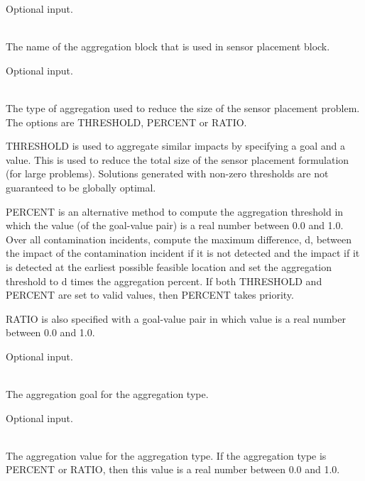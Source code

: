 \begin{description}[topsep=0pt,parsep=0.5em,itemsep=-0.4em]
\begin{description}[topsep=0pt,parsep=0.5em,itemsep=-0.4em]
                Optional input.
  \end{description}
  \item[{aggregate}]\hfill
  \begin{description}[topsep=0pt,parsep=0.5em,itemsep=-0.4em]
    \item[{name}]\hfill
\\The name of the aggregation block that is used in sensor placement block.
                
                Optional input.
    \item[{type}]\hfill
\\The type of aggregation used to reduce the size of the sensor placement problem.  
                The options are THRESHOLD, PERCENT or RATIO.

                THRESHOLD is used to aggregate similar impacts by specifying a goal and a value.  
                This is used to reduce the total size of the sensor placement formulation (for large problems).
                Solutions generated with non-zero thresholds are not guaranteed
                to be globally optimal.

                PERCENT is an alternative method to compute the aggregation threshold 
                in which the value (of the goal-value pair) is a real number between 0.0 and 1.0. 
                Over all contamination incidents, compute the maximum difference, d, between the impact of the
                contamination incident if it is not detected and the impact if it is detected
                at the earliest possible feasible location and set the aggregation threshold to 
                d times the aggregation percent. If both THRESHOLD and PERCENT are set to valid values, 
                then PERCENT takes priority.

                RATIO is also specified with a goal-value pair in which value is a real number between
                0.0 and 1.0.
                
                Optional input.
    \item[{goal}]\hfill
\\The aggregation goal for the aggregation type.
                
                Optional input.
    \item[{value}]\hfill
\\The aggregation value for the aggregation type. If the aggregation type is PERCENT or RATIO,
                then this value is a real number between 0.0 and 1.0.
                

\end{description}
\end{description}

